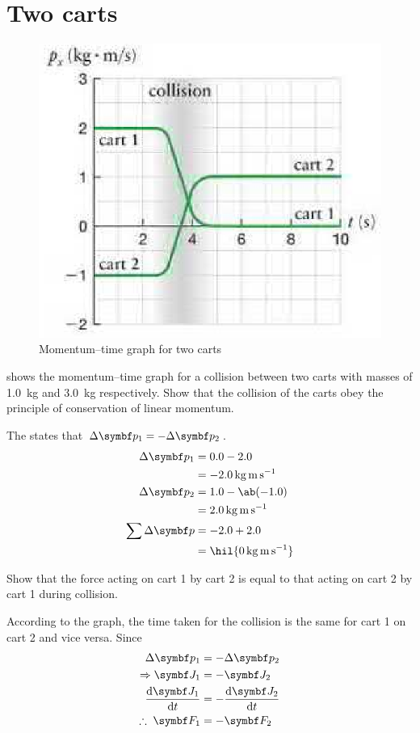 \section{Two carts}
\begin{figure}
  \centering
  \includegraphics[scale=0.5]{assets/momentumgraph.png}
  \caption{Momentum--time graph for two carts}
  \label{fig:twocarts}
\end{figure}
\begin{problem}
   shows the momentum--time graph for a
  collision between
  two carts with masses of \qty{1.0}{\kg} and \qty{3.0}{\kg} respectively.
  Show that the collision of the carts obey the principle of conservation
  of linear momentum.
\end{problem}

The  states that
\(\Delta\mv{p}_1 = -\Delta\mv{p}_2\).
\begin{align*}
  \Delta\mv{p}_1 &= 0.0 - 2.0 \\
  &= \qty{-2.0}{\kg\m\per\second} \\
  \Delta\mv{p}_2 &= 1.0 - \ab(-1.0) \\
  &= \qty{2.0}{\kg\m\per\second} \\
  \sum\Delta\mv{p} &= -2.0 + 2.0 \\
  &= \hil{\qty{0}{\kg\m\per\second}}
\end{align*}

\begin{problem}
  Show that the force acting on cart 1 by cart 2 is equal to that
  acting on cart 2 by cart 1 during collision.
\end{problem}
According to the graph, the time taken for the collision is the same
for cart 1 on cart 2 and vice versa. Since
\begin{align*}
  \Delta\mv{p}_1 &= -\Delta\mv{p}_2 \\
  \Rightarrow \mv{J}_1 &= -\mv{J}_2 \\
  \odv{\mv{J}_1}{t} &= -\odv{\mv{J}_2}{t} \\
  \therefore\; \mv{F}_1 &= -\mv{F}_2
\end{align*}

